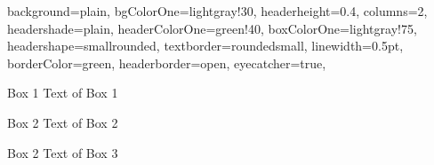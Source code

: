 \documentclass[portrait,fontscale=0.7,margin=0.7cm,paperwidth=15truecm, paperheight=9truecm,debug]{baposter}
\begin{document}
\begin{poster}{
  background=plain,
  bgColorOne=lightgray!30,
  headerheight=0.4\textheight,
  columns=2,
  headershade=plain,
  headerColorOne=green!40,
  boxColorOne=lightgray!75,
  headershape=smallrounded,
  textborder=roundedsmall,
  linewidth=0.5pt,
  borderColor=green,
  headerborder=open,
  eyecatcher=true,
}{}{}{}{}

\begin{posterbox}[column=0]{Box 1}
Text of Box 1
\end{posterbox}

\begin{posterbox}[column=0,below=auto,height=bottom]{Box 2}
Text of Box 2
\end{posterbox}

\begin{posterbox}[column=1,height=bottom]{Box 2}
Text of Box 3
\end{posterbox}

\end{poster}
\end{document}
